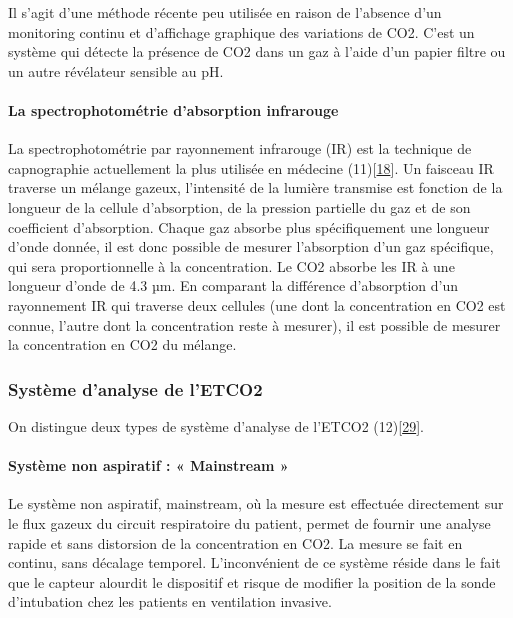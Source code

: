 \documentclass[12pt,]{article}
\let\oldparagraph\paragraph
\renewcommand{\paragraph}[1]{\oldparagraph{#1}\mbox{}}
\begin{document}
Il s'agit d'une méthode récente peu utilisée en raison de l'absence d'un
monitoring continu et d'affichage graphique des variations de CO2. C'est
un système qui détecte la présence de CO2 dans un gaz à l'aide d'un
papier filtre ou un autre révélateur sensible au pH.

\hypertarget{la-spectrophotometrie-dabsorption-infrarouge}{%
\paragraph{La spectrophotométrie d'absorption
infrarouge}\label{la-spectrophotometrie-dabsorption-infrarouge}}

La spectrophotométrie par rayonnement infrarouge (IR) est la technique
de capnographie actuellement la plus utilisée en médecine
(11){[}\protect\hyperlink{ref-bhavani1992capnometry}{18}{]}. Un faisceau
IR traverse un mélange gazeux, l'intensité de la lumière transmise est
fonction de la longueur de la cellule d'absorption, de la pression
partielle du gaz et de son coefficient d'absorption. Chaque gaz absorbe
plus spécifiquement une longueur d'onde donnée, il est donc possible de
mesurer l'absorption d'un gaz spécifique, qui sera proportionnelle à la
concentration. Le CO2 absorbe les IR à une longueur d'onde de 4.3 µm. En
comparant la différence d'absorption d'un rayonnement IR qui traverse
deux cellules (une dont la concentration en CO2 est connue, l'autre dont
la concentration reste à mesurer), il est possible de mesurer la
concentration en CO2 du mélange.

\hypertarget{systeme-danalyse-de-letco2}{%
\subsubsection{Système d'analyse de
l'ETCO2}\label{systeme-danalyse-de-letco2}}

On distingue deux types de système d'analyse de l'ETCO2
(12){[}\protect\hyperlink{ref-yosefy2004end}{29}{]}.

\hypertarget{systeme-non-aspiratif-mainstream}{%
\paragraph{Système non aspiratif : « Mainstream
»}\label{systeme-non-aspiratif-mainstream}}

Le système non aspiratif, mainstream, où la mesure est effectuée
directement sur le flux gazeux du circuit respiratoire du patient,
permet de fournir une analyse rapide et sans distorsion de la
concentration en CO2. La mesure se fait en continu, sans décalage
temporel. L'inconvénient de ce système réside dans le fait que le
capteur alourdit le dispositif et risque de modifier la position de la
sonde d'intubation chez les patients en ventilation invasive.
\end{document}
